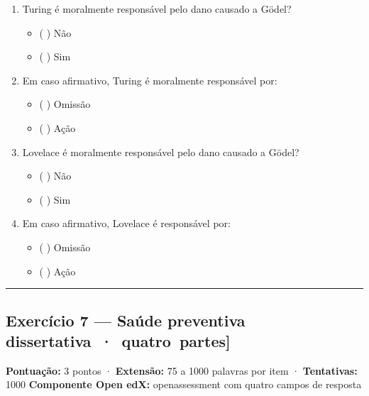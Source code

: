 \documentclass[
  11pt,
]{article}
\providecommand{\tightlist}{%
  \setlength{\itemsep}{0pt}\setlength{\parskip}{0pt}}
\renewcommand{\texttt}[1]{{\color{iaAmeixa}\small\ttfamily #1}}
\begin{document}
\begin{enumerate}
\def\labelenumi{\arabic{enumi}.}
\tightlist
\item
  Turing é moralmente responsável pelo dano causado a Gödel?

  \begin{itemize}
  \tightlist
  \item
    ( ) Não
  \item
    ( ) Sim
  \end{itemize}
\item
  Em caso afirmativo, Turing é moralmente responsável por:

  \begin{itemize}
  \tightlist
  \item
    ( ) Omissão
  \item
    ( ) Ação
  \end{itemize}
\item
  Lovelace é moralmente responsável pelo dano causado a Gödel?

  \begin{itemize}
  \tightlist
  \item
    ( ) Não
  \item
    ( ) Sim
  \end{itemize}
\item
  Em caso afirmativo, Lovelace é responsável por:

  \begin{itemize}
  \tightlist
  \item
    ( ) Omissão
  \item
    ( ) Ação
  \end{itemize}
\end{enumerate}

\begin{center}\rule{0.5\linewidth}{0.5pt}\end{center}

\hypertarget{exercuxedcio-7-sauxfade-preventiva-dissertativa-quatro-partes}{%
\subsection{\texorpdfstring{Exercício 7 --- Saúde preventiva
\texttt{{[}dissertativa\ ·\ quatro\ partes{]}}}{Exercício 7 --- Saúde preventiva {[}dissertativa · quatro partes{]}}}\label{exercuxedcio-7-sauxfade-preventiva-dissertativa-quatro-partes}}

\textbf{Pontuação:} 3 pontos · \textbf{Extensão:} 75 a 1000 palavras por
item · \textbf{Tentativas:} 1000 \textbf{Componente Open edX:}
\texttt{openassessment} com quatro campos de resposta
\end{document}
